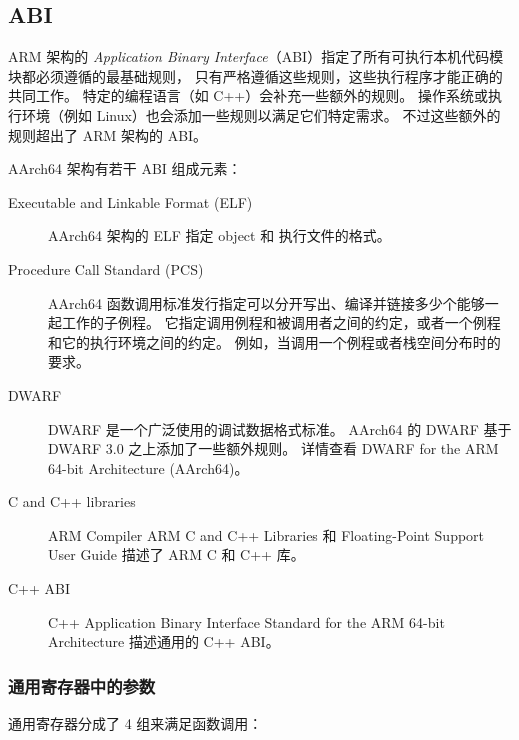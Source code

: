 \subsection{ABI}

ARM 架构的 \textit{Application Binary Interface}（ABI）指定了所有可执行本机代码模块都必须遵循的最基础规则，
只有严格遵循这些规则，这些执行程序才能正确的共同工作。
特定的编程语言（如 C++）会补充一些额外的规则。
操作系统或执行环境（例如 Linux）也会添加一些规则以满足它们特定需求。
不过这些额外的规则超出了 ARM 架构的 ABI。

AArch64 架构有若干 ABI 组成元素：

\begin{description}
  \item[Executable and Linkable Format (ELF)]
    AArch64 架构的 ELF 指定 object 和 执行文件的格式。
  \item[Procedure Call Standard (PCS)]
    AArch64 函数调用标准发行指定可以分开写出、编译并链接多少个能够一起工作的子例程。
    它指定调用例程和被调用者之间的约定，或者一个例程和它的执行环境之间的约定。
    例如，当调用一个例程或者栈空间分布时的要求。
  \item[DWARF]
    DWARF 是一个广泛使用的调试数据格式标准。
    AArch64 的 DWARF 基于 DWARF 3.0 之上添加了一些额外规则。
    详情查看 DWARF for the ARM 64-bit Architecture (AArch64)。
  \item[C and C++ libraries]
    ARM Compiler ARM C and C++ Libraries 和 Floating-Point Support User Guide 描述了 ARM C 和 C++ 库。
  \item[C++ ABI]
    C++ Application Binary Interface Standard for the ARM 64-bit Architecture 描述通用的 C++ ABI。
\end{description}

\subsubsection{通用寄存器中的参数}

通用寄存器分成了 4 组来满足函数调用：

